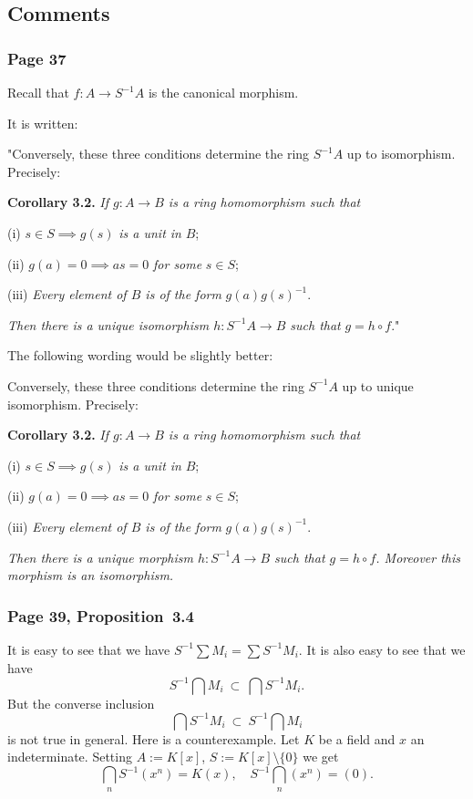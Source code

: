 \documentclass[12pt,letterpaper]{article}%
\newcommand{\nn}{\noindent}
\begin{document}
\subsection{Comments}%

\subsubsection{Page 37}%

Recall that $f:A\to S^{-1}A$ is the canonical morphism.

It is written:

"Conversely, these three conditions determine the ring $S^{-1}A$ up to isomorphism. Precisely:

\nn\textbf{Corollary 3.2.} \emph{If $g:A\to B$ is a ring homomorphism such that}

\nn(i) $s\in S\implies g(s)$ \emph{is a unit in} $B$;

\nn(ii) $g(a)=0\implies as=0$ \emph{for some} $s\in S$;

\nn(iii) \emph{Every element of $B$ is of the form} $g(a)g(s)^{-1}$.

\nn\emph{Then there is a unique isomorphism $h:S^{-1}A\to B$ such that} $g=h\circ f$."

The following wording would be slightly better:

Conversely, these three conditions determine the ring $S^{-1}A$ up to unique isomorphism. Precisely:

\nn\textbf{Corollary 3.2.} \emph{If $g:A\to B$ is a ring homomorphism such that}

\nn(i) $s\in S\implies g(s)$ \emph{is a unit in} $B$;

\nn(ii) $g(a)=0\implies as=0$ \emph{for some} $s\in S$;

\nn(iii) \emph{Every element of $B$ is of the form} $g(a)g(s)^{-1}$.

\nn\emph{Then there is a unique morphism $h:S^{-1}A\to B$ such that $g=h\circ f$. Moreover this morphism is an isomorphism.}

\subsubsection{Page 39, Proposition~3.4}%

It is easy to see that we have $S^{-1}\sum M_i=\sum S^{-1}M_i$. It is also easy to see that we have 
$$
S^{-1}\bigcap M_i\ \subset\ \bigcap S^{-1}M_i.
$$ 
But the converse inclusion 
$$
\bigcap S^{-1}M_i\ \subset\ S^{-1}\bigcap M_i
$$ 
is not true in general. Here is a counterexample. Let $K$ be a field and $x$ an indeterminate. Setting $A:=K[x]$, $S:=K[x]\setminus\{0\}$ we get 
$$
\bigcap_n S^{-1}(x^n)=K(x),\quad S^{-1}\bigcap_n(x^n)=(0).
$$
\end{document}
